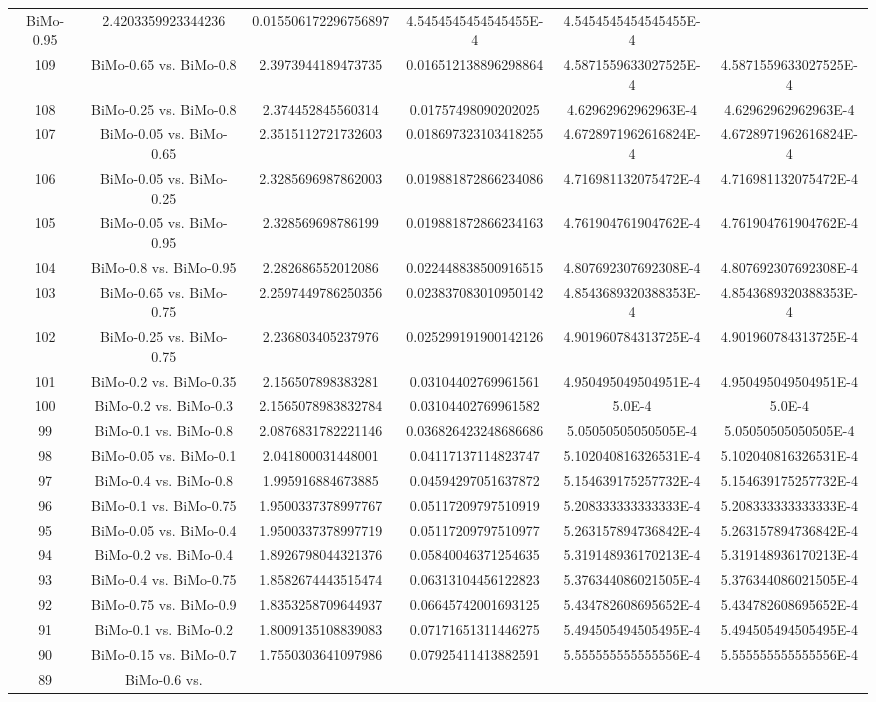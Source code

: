 \documentclass[a4paper,10pt]{article}
\begin{document}
\begin{landscape}
\begin{table}[!htp]
\begin{tabular}{cccccc}
BiMo-0.95&2.4203359923344236&0.015506172296756897&4.5454545454545455E-4&4.5454545454545455E-4\\109&BiMo-0.65 vs. BiMo-0.8&2.3973944189473735&0.016512138896298864&4.5871559633027525E-4&4.5871559633027525E-4\\108&BiMo-0.25 vs. BiMo-0.8&2.374452845560314&0.01757498090202025&4.62962962962963E-4&4.62962962962963E-4\\107&BiMo-0.05 vs. BiMo-0.65&2.3515112721732603&0.018697323103418255&4.6728971962616824E-4&4.6728971962616824E-4\\106&BiMo-0.05 vs. BiMo-0.25&2.3285696987862003&0.019881872866234086&4.716981132075472E-4&4.716981132075472E-4\\105&BiMo-0.05 vs. BiMo-0.95&2.328569698786199&0.019881872866234163&4.761904761904762E-4&4.761904761904762E-4\\104&BiMo-0.8 vs. BiMo-0.95&2.282686552012086&0.022448838500916515&4.807692307692308E-4&4.807692307692308E-4\\103&BiMo-0.65 vs. BiMo-0.75&2.2597449786250356&0.023837083010950142&4.8543689320388353E-4&4.8543689320388353E-4\\102&BiMo-0.25 vs. BiMo-0.75&2.236803405237976&0.025299191900142126&4.901960784313725E-4&4.901960784313725E-4\\101&BiMo-0.2 vs. BiMo-0.35&2.156507898383281&0.03104402769961561&4.950495049504951E-4&4.950495049504951E-4\\100&BiMo-0.2 vs. BiMo-0.3&2.1565078983832784&0.03104402769961582&5.0E-4&5.0E-4\\99&BiMo-0.1 vs. BiMo-0.8&2.0876831782221146&0.036826423248686686&5.05050505050505E-4&5.05050505050505E-4\\98&BiMo-0.05 vs. BiMo-0.1&2.041800031448001&0.04117137114823747&5.102040816326531E-4&5.102040816326531E-4\\97&BiMo-0.4 vs. BiMo-0.8&1.995916884673885&0.04594297051637872&5.154639175257732E-4&5.154639175257732E-4\\96&BiMo-0.1 vs. BiMo-0.75&1.9500337378997767&0.05117209797510919&5.208333333333333E-4&5.208333333333333E-4\\95&BiMo-0.05 vs. BiMo-0.4&1.9500337378997719&0.05117209797510977&5.263157894736842E-4&5.263157894736842E-4\\94&BiMo-0.2 vs. BiMo-0.4&1.8926798044321376&0.05840046371254635&5.319148936170213E-4&5.319148936170213E-4\\93&BiMo-0.4 vs. BiMo-0.75&1.8582674443515474&0.06313104456122823&5.376344086021505E-4&5.376344086021505E-4\\92&BiMo-0.75 vs. BiMo-0.9&1.8353258709644937&0.06645742001693125&5.434782608695652E-4&5.434782608695652E-4\\91&BiMo-0.1 vs. BiMo-0.2&1.8009135108839083&0.07171651311446275&5.494505494505495E-4&5.494505494505495E-4\\90&BiMo-0.15 vs. BiMo-0.7&1.7550303641097986&0.07925411413882591&5.555555555555556E-4&5.555555555555556E-4\\89&BiMo-0.6 vs. 
\end{tabular}
\end{table}
\end{landscape}
\end{document}
